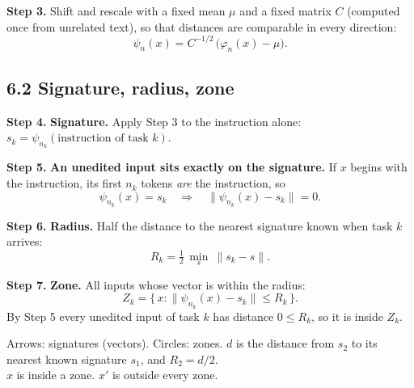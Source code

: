 \documentclass[11pt,a4paper]{article}
\newcommand{\step}[1]{\textbf{Step #1.}}
\begin{document}
\step{3} Shift and rescale with a fixed mean $\mu$ and a fixed matrix $C$ (computed once from
unrelated text), so that distances are comparable in every direction:
\[ \psi_n(x) = C^{-1/2}\,\bigl(\varphi_n(x) - \mu\bigr). \]

\subsection*{6.2 Signature, radius, zone}

\step{4} \textbf{Signature.} Apply Step 3 to the instruction alone: \quad $s_k = \psi_{n_k}(\text{instruction of task } k)$.

\step{5} \textbf{An unedited input sits exactly on the signature.} If $x$ begins with the instruction,
its first $n_k$ tokens \emph{are} the instruction, so
\[ \psi_{n_k}(x) = s_k \quad\Longrightarrow\quad \|\psi_{n_k}(x) - s_k\| = 0 . \]

\step{6} \textbf{Radius.} Half the distance to the nearest signature known when task $k$ arrives:
\[ R_k = \tfrac12 \,\min_{s}\ \|s_k - s\| . \]

\step{7} \textbf{Zone.} All inputs whose vector is within the radius:
\[ Z_k = \{\,x : \|\psi_{n_k}(x) - s_k\| \le R_k\,\}. \]
By Step 5 every unedited input of task $k$ has distance $0 \le R_k$, so it is inside $Z_k$.

\begin{center}

{\small Arrows: signatures (vectors). Circles: zones. $d$ is the distance from $s_2$ to its nearest
known signature $s_1$, and $R_2 = d/2$.\\ $x$ is inside a zone. $x'$ is outside every zone.}
\end{center}
\end{document}
